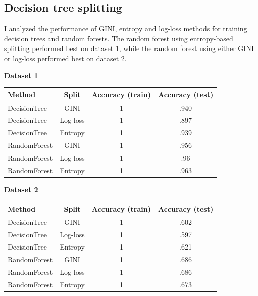 \documentclass{article}
\begin{document}
\subsection{Decision tree splitting}

I analyzed the performance of GINI, entropy and log-loss methods for training decision trees and random forests. The random forest using entropy-based splitting performed best on dataset 1, while the random forest using either GINI or log-loss performed best on dataset 2.

\begin{center}\textbf{Dataset 1}\end{center}
\begin{center}
\begin{tabular}{| l | c | c | c |}
    \hline
    \textbf{Method} & \textbf{Split} & \textbf{Accuracy (train)} & \textbf{Accuracy (test)} \\
    \hline
        DecisionTree & GINI & 1 & .940 \\
        DecisionTree & Log-loss & 1 & .897 \\
        DecisionTree & Entropy & 1 & .939 \\
        RandomForest & GINI & 1 & .956 \\
        RandomForest & Log-loss & 1 & .96\\
        RandomForest & Entropy & 1 & .963 \\
    \hline
\end{tabular}
\end{center}

\begin{center}\textbf{Dataset 2}\end{center}
\begin{center}
\begin{tabular}{| l | c | c | c |}
    \hline
    \textbf{Method} & \textbf{Split} & \textbf{Accuracy (train)} & \textbf{Accuracy (test)} \\
    \hline
        DecisionTree & GINI & 1 & .602 \\
        DecisionTree & Log-loss & 1 & .597 \\
        DecisionTree & Entropy & 1 & .621 \\
        RandomForest & GINI & 1 & .686 \\
        RandomForest & Log-loss & 1 & .686 \\
        RandomForest & Entropy & 1 & .673 \\
    \hline
\end{tabular}
\end{center}
\end{document}

